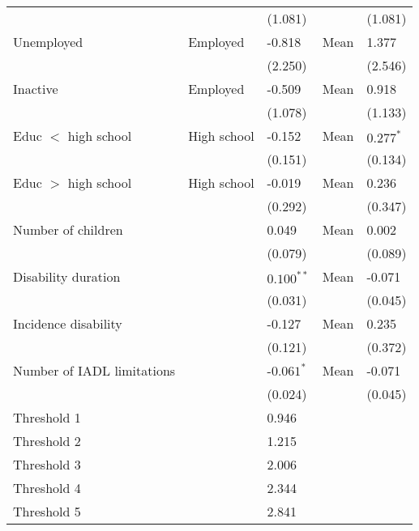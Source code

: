 \documentclass[12pt]{article}
\begin{document}
\begin{table}[h!]
\begin{tabular}{ll l l l}
                            &               &  (1.081)       &           &  (1.081)\\
Unemployed                  & Employed      & -0.818         & Mean      &  1.377\\
                            &               &  (2.250)       &           &  (2.546)\\
Inactive                    & Employed      & -0.509         & Mean      &  0.918\\
                            &               &  (1.078)       &           &  (1.133)\\
Educ $<$ high school        & High school   & -0.152         & Mean      &  $0.277^{*}$\\
                            &               &  (0.151)       &           &  (0.134)\\
Educ $>$ high school        & High school   & -0.019         & Mean      &  0.236\\
                            &               &  (0.292)       &           &  (0.347)\\
Number of children          &               &  0.049         & Mean      &  0.002\\
                            &               &  (0.079)       &           &  (0.089)\\
Disability duration         &               &  $0.100^{**}$  & Mean      & -0.071\\
                            &               &  (0.031)       &           &  (0.045)\\
Incidence disability        &               & -0.127         & Mean      &  0.235\\
                            &               &  (0.121)       &           &  (0.372)\\
Number of IADL limitations  &               & -$0.061^{*}$   & Mean      & -0.071\\
                            &               &  (0.024)       &           &  (0.045)\\
Threshold 1                 &               &  0.946         &&\\
Threshold 2                 &               &  1.215         &&\\
Threshold 3                 &               &  2.006         &&\\
Threshold 4                 &               &  2.344         &&\\
Threshold 5                 &               &  2.841         &&\\

\end{tabular}
\end{table}
\end{document}

